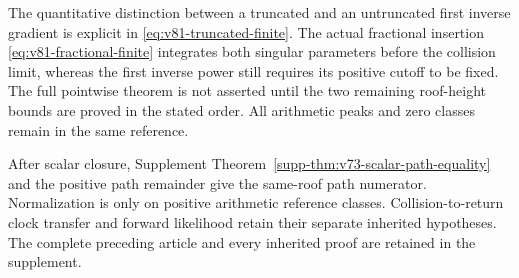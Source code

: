 \documentclass[11pt,reqno]{amsart}
\numberwithin{equation}{section}
\theoremstyle{definition}
\theoremstyle{remark}\newtheorem{remark}[theorem]{Remark}
\begin{document}
The quantitative distinction between a truncated and an untruncated
first inverse gradient is explicit in
\eqref{eq:v81-truncated-finite}. The actual fractional insertion
\eqref{eq:v81-fractional-finite} integrates both singular parameters
before the collision limit, whereas the first inverse power still
requires its positive cutoff to be fixed. The full pointwise theorem
is not asserted until the two remaining roof-height bounds are
proved in the stated order. All arithmetic peaks and zero classes
remain in the same reference.

After scalar closure, Supplement
Theorem~\ref{supp-thm:v73-scalar-path-equality} and the positive path
remainder give the same-roof path numerator. Normalization is only
on positive arithmetic reference classes. Collision-to-return clock
transfer and forward likelihood retain their separate inherited
hypotheses. The complete preceding article and every inherited proof
are retained in the supplement.




\end{document}
